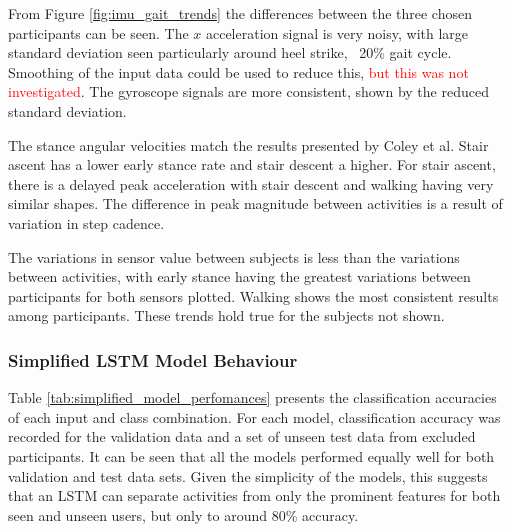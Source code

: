 \documentclass[sensors,article,submit,moreauthors,pdftex]{Definitions/mdpi}
\begin{document}
From Figure \ref{fig:imu_gait_trends} the differences between the three chosen participants can be seen. The $x$ acceleration signal is very noisy, with large standard deviation seen particularly around heel strike, ~20\% gait cycle. Smoothing of the input data could be used to reduce this, \textcolor{red}{but this was not investigated}. The gyroscope signals are more consistent, shown by the reduced standard deviation.

The stance angular velocities match the results presented by Coley et al\cite{Coley2005}. Stair ascent has a lower early stance rate and stair descent a higher. For stair ascent, there is a delayed peak acceleration with stair descent and walking having very similar shapes. The difference in peak magnitude between activities is a result of variation in step cadence.

The variations in sensor value between subjects is less than the variations between activities, with early stance having the greatest variations between participants for both sensors plotted. Walking shows the most consistent results among participants. These trends hold true for the subjects not shown.

\subsubsection{Simplified LSTM Model Behaviour}
Table \ref{tab:simplified_model_perfomances} presents the classification accuracies of each input and class combination. For each model, classification accuracy was recorded for the validation data and a set of unseen test data from excluded participants. It can be seen that all the models performed equally well for both validation and test data sets. Given the simplicity of the models, this suggests that an LSTM can separate activities from only the prominent features for both seen and unseen users, but only to around 80\% accuracy.
\end{document}
